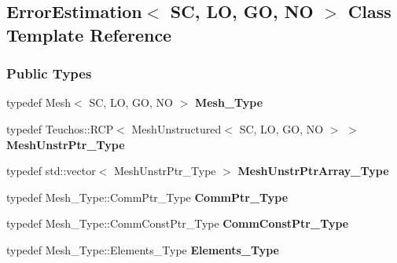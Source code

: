 \hypertarget{classFEDD_1_1ErrorEstimation}{}\subsection{Error\+Estimation$<$ SC, LO, GO, NO $>$ Class Template Reference}
\label{classFEDD_1_1ErrorEstimation}
\subsubsection*{Public Types}
\begin{DoxyCompactItemize}
\item 
\mbox{\label{classFEDD_1_1ErrorEstimation_a1e469aabe3952e2cd5797236ba2d80b7}} 
typedef Mesh$<$ SC, LO, GO, NO $>$ {\bfseries Mesh\+\_\+\+Type}
\item 
\mbox{\label{classFEDD_1_1ErrorEstimation_a5dfa0d2bb61c7c09eb7b752b8353cf16}} 
typedef Teuchos\+::\+R\+CP$<$ Mesh\+Unstructured$<$ SC, LO, GO, NO $>$ $>$ {\bfseries Mesh\+Unstr\+Ptr\+\_\+\+Type}
\item 
\mbox{\label{classFEDD_1_1ErrorEstimation_a049d8b7e6d1b66326cb5f7576e94a517}} 
typedef std\+::vector$<$ Mesh\+Unstr\+Ptr\+\_\+\+Type $>$ {\bfseries Mesh\+Unstr\+Ptr\+Array\+\_\+\+Type}
\item 
\mbox{\label{classFEDD_1_1ErrorEstimation_aa7b0ab20b8659e451330976480944e37}} 
typedef Mesh\+\_\+\+Type\+::\+Comm\+Ptr\+\_\+\+Type {\bfseries Comm\+Ptr\+\_\+\+Type}
\item 
\mbox{\label{classFEDD_1_1ErrorEstimation_a96e4037869de7d2d55b318fac0dd68fe}} 
typedef Mesh\+\_\+\+Type\+::\+Comm\+Const\+Ptr\+\_\+\+Type {\bfseries Comm\+Const\+Ptr\+\_\+\+Type}
\item 
\mbox{\label{classFEDD_1_1ErrorEstimation_af02e74509b91e0efeb18d847dbf22d33}} 
typedef Mesh\+\_\+\+Type\+::\+Elements\+\_\+\+Type {\bfseries Elements\+\_\+\+Type}
\item 
\mbox{\label{classFEDD_1_1ErrorEstimation_a6a376912bffdf1fcd740ffd7c6db719f}} 

\end{DoxyCompactItemize}
